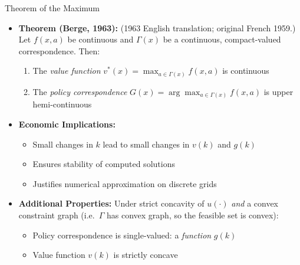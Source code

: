 \begin{frame}{Theorem of the Maximum}
\begin{itemize}
\item \textbf{Theorem (Berge, 1963):} (1963 English translation; original French 1959.) Let $f(x, a)$ be continuous and $\Gamma(x)$ be a continuous, compact-valued correspondence. Then:
\begin{enumerate}
    \item The \emph{value function} $v^*(x) = \max_{a \in \Gamma(x)} f(x,a)$ is continuous
    \item The \emph{policy correspondence} $G(x) = \arg\max_{a \in \Gamma(x)} f(x,a)$ is upper hemi-continuous
\end{enumerate}

\medskip
\item \textbf{Economic Implications:}
\begin{itemize}
    \item Small changes in $k$ lead to small changes in $v(k)$ and $g(k)$
    \item Ensures stability of computed solutions
    \item Justifies numerical approximation on discrete grids
\end{itemize}

\medskip
\item \textbf{Additional Properties:} Under strict concavity of $u(\cdot)$ \emph{and} a convex constraint graph (i.e.\ $\Gamma$ has convex graph, so the feasible set is convex):
\begin{itemize}
    \item Policy correspondence is single-valued: a \emph{function} $g(k)$
    \item Value function $v(k)$ is strictly concave
\end{itemize}
\end{itemize}
\end{frame}

